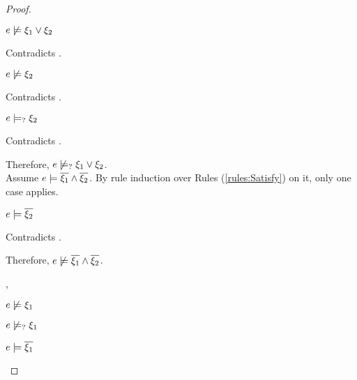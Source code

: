 \begin{proof}
\begin{byCases}
\begin{byCases}
        \begin{byCases}
        \item[\text{(\ref{rule:CMSNotVal})}]
            \begin{pfsteps*}
            \item $e \not\models \xi_1 \vee \xi_2$ 
            \end{pfsteps*}
            Contradicts .
        \item[\text{(\ref{rule:CMSOr1})}]
            \begin{pfsteps*}
            \item $e \not\models \xi_2$ 
            \end{pfsteps*}
            Contradicts .
        \item[\text{(\ref{rule:CMSOr2})}]
            \begin{pfsteps*}
            \item $e \models_{?} \xi_2$ 
            \end{pfsteps*}
            Contradicts .
        \end{byCases}
        Therefore, $e \not\models_{?} \xi_1 \vee \xi_2$. \\
        Assume $e \models \overline{\xi_1} \wedge \overline{\xi_2}$. By rule induction over Rules (\ref{rules:Satisfy}) on it, only one case applies.
        \begin{byCases}
        \item[\text{(\ref{rule:CSAnd})}]
            \begin{pfsteps*}
            \item $e \models \overline{\xi_2}$ 
            \end{pfsteps*}
            Contradicts .
        \end{byCases}
        Therefore, $e \not\models \overline{\xi_1} \wedge \overline{\xi_2}$.
    \item[\csatisfy{e}{\cdual{\xi_1}},\cmaysatisfy{e}{\xi_2}]
        \begin{pfsteps*}
        \item $e \not\models \xi_1$  
        \item $e \not\models_{?} \xi_1$  
        \item $e \models \overline{\xi_1}$  

\end{pfsteps*}
\end{byCases}
\end{byCases}
\end{proof}
